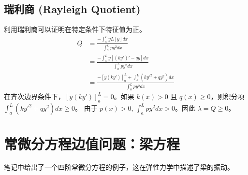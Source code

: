 \documentclass{article}
\begin{document}
	\subsection{瑞利商 (Rayleigh Quotient)}
	利用瑞利商可以证明在特定条件下特征值为正。
	\begin{align*}
		Q &= \frac{-\int_a^L y L[y] dx}{\int_a^L p y^2 dx} \\
		&= \frac{-\int_a^L y[(ky')'-qy]dx}{\int_a^L p y^2 dx} \\
		&= \frac{-\left[y(ky')\right]_a^L + \int_a^L (ky'^2 + qy^2)dx}{\int_a^L p y^2 dx}
	\end{align*}
	在齐次边界条件下，$\left[y(ky')\right]_a^L = 0$。如果 $k(x)>0$ 且 $q(x) \ge 0$，则积分项 $\int_a^L (ky'^2 + qy^2)dx \ge 0$。
	由于 $p(x)>0$, $\int_a^L p y^2 dx > 0$。因此 $\lambda = Q \ge 0$。
	
	\section{常微分方程边值问题：梁方程}
	笔记中给出了一个四阶常微分方程的例子，这在弹性力学中描述了梁的振动。
	
\end{document}
